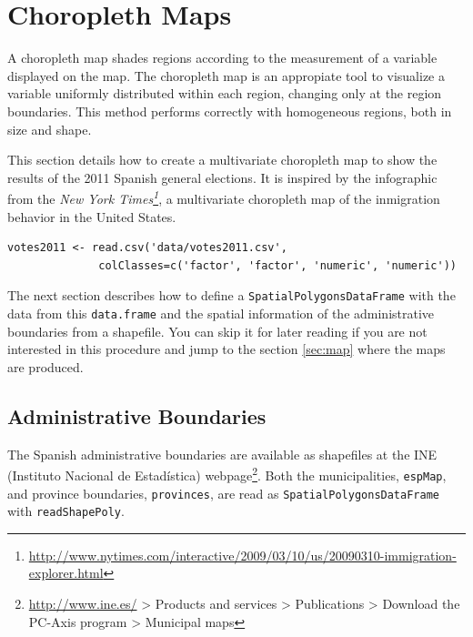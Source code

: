 
\section{Choropleth Maps}
\label{sec-1}
\label{sec:multiChoropleth}
A choropleth map shades regions according to the measurement of a
variable displayed on the map. The choropleth map is an appropiate
tool to visualize a variable uniformly distributed within each
region, changing only at the region boundaries. This method
performs correctly with homogeneous regions, both in size and
shape.  

This section details how to create a multivariate choropleth map to
show the results of the 2011 Spanish general elections. It is inspired
by the infographic from the \emph{New York Times\footnote{\url{http://www.nytimes.com/interactive/2009/03/10/us/20090310-immigration-explorer.html}}}, a multivariate
choropleth map of the inmigration behavior in the United States.

\lstset{language=R,numbers=none}
\begin{lstlisting}
votes2011 <- read.csv('data/votes2011.csv',
		      colClasses=c('factor', 'factor', 'numeric', 'numeric'))
\end{lstlisting}

The next section describes how to define a \texttt{SpatialPolygonsDataFrame}
with the data from this \texttt{data.frame} and the spatial information of
the administrative boundaries from a shapefile. You can skip it for
later reading if you are not interested in this procedure and jump to
the section \ref{sec:map} where the maps are produced.

\subsection{\floweroneleft Administrative Boundaries}
\label{sec-1-1}

The Spanish administrative boundaries are available as shapefiles at
the INE (Instituto Nacional de Estadística) webpage\footnote{\url{http://www.ine.es/} > Products and services > Publications > Download the PC-Axis program > Municipal maps}. Both the
municipalities, \texttt{espMap}, and province boundaries, \texttt{provinces}, are
read as \texttt{SpatialPolygonsDataFrame} with \texttt{readShapePoly}.


